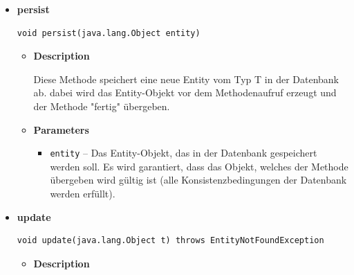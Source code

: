 \documentclass[11pt,a4paper]{article}
\begin{document}
{{{{{{{{{\begin{itemize}
{\begin{itemize}
{Diese Methode gibt ein Entity-Objekt zurück, das anhand seines Primärschlüssels aus der Datenbank geholt wurde.
}
\item{
{\bf  Parameters}
  \begin{itemize}
   \item{
\texttt{key} -- Der Primärschlüssel der Entity, die aus der Datenbank geholt werden soll. Der Datentyp wird von dem Generic PK bestimmt, mit dem das Interface implementiert wird.}
  \end{itemize}
}%
\item{{\bf  Returns} -- 
Ein Entity-Objekt, das durch den Schlüssel identifiziert wurde. Konnte keine passende Entity in der Datenbank gefunden werden, gibt die Methode null zurück. 
}%
\end{itemize}
}%
\item{ 
\hypertarget{edu.kit.pse17.go_app.PersistenceLayer.daos.AbstractDao.persist(T)}{{\bf  persist}\\}
\begin{lstlisting}[frame=none]
void persist(java.lang.Object entity)\end{lstlisting} %
\begin{itemize}
\item{
{\bf  Description}

Diese Methode speichert eine neue Entity vom Typ T in der Datenbank ab. dabei wird das Entity-Objekt vor dem Methodenaufruf erzeugt und der Methode "fertig" übergeben.
}
\item{
{\bf  Parameters}
  \begin{itemize}
   \item{
\texttt{entity} -- Das Entity-Objekt, das in der Datenbank gespeichert werden soll. Es wird garantiert, dass das Objekt, welches der Methode übergeben wird gültig ist (alle Konsistenzbedingungen der Datenbank werden erfüllt).}
  \end{itemize}
}%
\end{itemize}
}%
\item{ 
\hypertarget{edu.kit.pse17.go_app.PersistenceLayer.daos.AbstractDao.update(T)}{{\bf  update}\\}
\begin{lstlisting}[frame=none]
void update(java.lang.Object t) throws EntityNotFoundException\end{lstlisting} %
\begin{itemize}
\item{
{\bf  Description}

}
\end{itemize}}
\end{itemize}}}}}}}}}}
\end{document}
